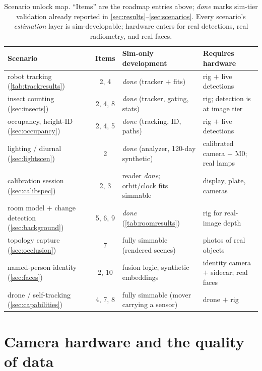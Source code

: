 \documentclass[11pt]{article}
\theoremstyle{definition}
\begin{document}
\begin{table}[ht]
\centering
\scriptsize
\setlength{\tabcolsep}{3.5pt}
\begin{tabular}{l c l l}
\toprule
Scenario & Items & Sim-only development & Requires hardware \\
\midrule
robot tracking (\autoref{tab:trackresults}) & 2, 4 & \emph{done} (tracker $+$ fits) & rig $+$ live detections \\
insect counting (\autoref{sec:insects}) & 2, 4, 8 & \emph{done} (tracker, gating, stats) & rig; detection is at image tier \\
occupancy, height-ID (\autoref{sec:occupancy}) & 2, 4, 5 & \emph{done} (tracking, ID, paths) & rig $+$ live detections \\
lighting / diurnal (\autoref{sec:lightscen}) & 2 & \emph{done} (analyzer, 120-day synthetic) & calibrated camera $+$ M0; real lamps \\
calibration session (\autoref{sec:calibspec}) & 2, 3 & reader \emph{done}; orbit/clock fits simmable & display, plate, cameras \\
room model $+$ change detection (\autoref{sec:background}) & 5, 6, 9 & \emph{done} (\autoref{tab:roomresults}) & rig for real-image depth \\
topology capture (\autoref{sec:occlusion}) & 7 & fully simmable (rendered scenes) & photos of real objects \\
named-person identity (\autoref{sec:faces}) & 2, 10 & fusion logic, synthetic embeddings & identity camera $+$ sidecar; real faces \\
drone / self-tracking (\autoref{sec:capabilities}) & 4, 7, 8 & fully simmable (mover carrying a sensor) & drone $+$ rig \\
\bottomrule
\end{tabular}
\caption{Scenario unlock map. ``Items'' are the roadmap entries above;
\emph{done} marks sim-tier validation already reported in
\autoref{sec:results}--\autoref{sec:scenarios}. Every scenario's
\emph{estimation} layer is sim-developable; hardware enters for real
detections, real radiometry, and real faces.}
\label{tab:unlocks}
\end{table}

\appendix
\section{Camera hardware and the quality of data}
\label{sec:hardware}
\end{document}
